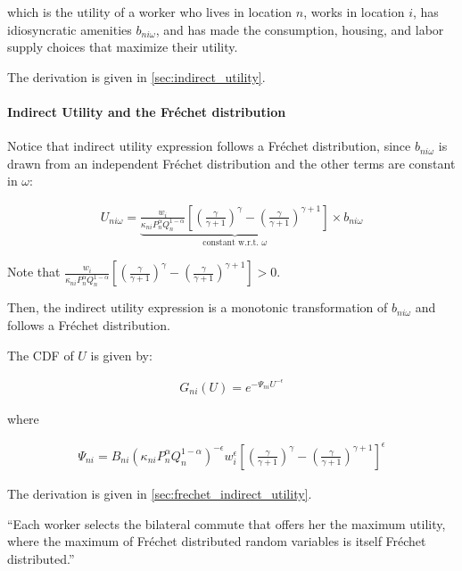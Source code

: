 \documentclass[10pt]{article}
\begin{document}
which is the utility of a worker who lives in location $n$,
works in location $i$, has idiosyncratic amenities $b_{n i \omega}$,
and has made the consumption, housing, and labor supply choices that
maximize their utility.

The derivation is given in \autoref{sec:indirect_utility}.

\paragraph{Indirect Utility and the Fréchet distribution}

Notice that indirect utility expression follows a Fréchet distribution,
since $b_{n i \omega}$ is drawn from an independent Fréchet distribution
and the other terms are constant in $\omega$:

\begin{align}
    U_{n i \omega}=\underbrace{\frac{w_i}{\kappa_{n i} P_n^\alpha Q_n^{1-\alpha}} \left[\left(\frac{\gamma}{\gamma+1}\right)^\gamma-\left(\frac{\gamma}{\gamma+1}\right)^{\gamma+1}\right]}_{\text {constant w.r.t. } \omega} \times b_{n i \omega}
\end{align}

Note that $\frac{w_i}{\kappa_{n i} P_n^\alpha Q_n^{1-\alpha}} \left[\left(\frac{\gamma}{\gamma+1}\right)^\gamma-\left(\frac{\gamma}{\gamma+1}\right)^{\gamma+1}\right] > 0$.

Then, the indirect utility expression is a monotonic 
transformation of $b_{n i \omega}$ and 
follows a Fréchet distribution.

The CDF of $U$ is given by:

\begin{align}
    G_{n i}(U)=e^{-\Psi_{n i} U^{-\epsilon}} \label{eq:frechet_indirect_utility}
\end{align}

where 

\begin{align}
    \Psi_{n i}=B_{n i}\left(\kappa_{n i} P_n^\alpha Q_n^{1-\alpha}\right)^{-\epsilon} w_i^\epsilon \left[\left(\frac{\gamma}{\gamma+1}\right)^\gamma-\left(\frac{\gamma}{\gamma+1}\right)^{\gamma+1}\right]^\epsilon \label{eq:psi_exp}
\end{align}

The derivation is given in \autoref{sec:frechet_indirect_utility}.

``Each worker selects the
bilateral commute that offers her the maximum utility, where the maximum of
Fréchet distributed random variables is itself Fréchet distributed.''
\end{document}
